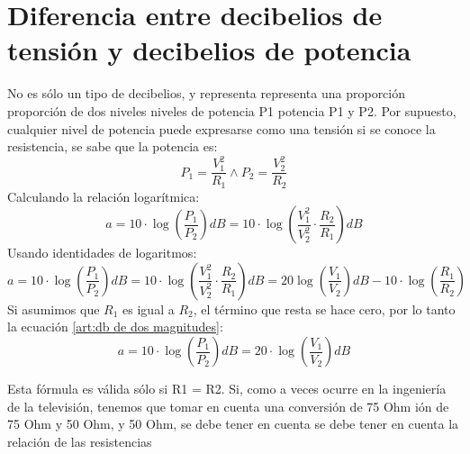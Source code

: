 \documentclass[
	12pt, %
	fleqn, %
	a4paper, %
	oneside, %
]{LegrandOrangeBook}
\begin{document}
\section{Diferencia entre decibelios de tensión y decibelios de potencia}
No es sólo un tipo de decibelios, y representa representa una proporción proporción de dos niveles niveles de potencia P1 potencia P1 y P2. Por supuesto, cualquier nivel de potencia puede expresarse como una tensión si se conoce la resistencia, se sabe que la potencia es:
\begin{displaymath}
P_1=\frac{V^2_1}{R_1} \land P_2=\frac{V^2_2}{R_2}
\end{displaymath}
Calculando la relación logarítmica:
\begin{displaymath}
a=10\cdot\log\left(\frac{P_1}{P_2}\right)dB=10\cdot\log\left(\frac{V_1^2}{V_2^2}\cdot\frac{R_2}{R_1}\right)dB
\end{displaymath}
Usando identidades de logaritmos:
\begin{equation}
\label{art:db de dos magnitudes}
a=10\cdot\log\left(\frac{P_1}{P_2}\right)dB=10\cdot\log\left(\frac{V_1^2}{V_2^2}\cdot\frac{R_2}{R_1}\right)dB=20\log\left(\frac{V_1}{V_2}\right)dB-10\cdot\log\left(\frac{R_1}{R_2}\right)
\end{equation}
Si asumimos que $R_1$ es igual a $R_2$, el término que resta se hace cero, por lo tanto la ecuación \ref{art:db de dos magnitudes}:
\begin{equation}
\label{art:db 10 20}
a=10\cdot\log\left(\frac{P_1}{P_2}\right)dB=20\cdot\log\left(\frac{V_1}{V_2}\right)dB
\end{equation}
\begin{remark}
Esta fórmula es válida sólo si R1 = R2. Si, como a veces ocurre en la ingeniería de la televisión, tenemos que tomar en cuenta una conversión de 75 Ohm ión de 75 Ohm y 50 Ohm, y 50 Ohm, se debe tener en cuenta se debe tener en  cuenta la relación de las resistencias
\end{remark}
\end{document}
